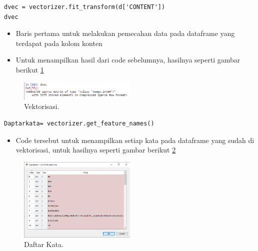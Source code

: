 \begin{enumerate}
\begin{verbatim}
dvec = vectorizer.fit_transform(d['CONTENT'])
dvec
\end{verbatim}
\begin{itemize}
\item Baris pertama untuk melakukan pemecahan data pada dataframe yang terdapat pada kolom konten
\item Untuk menampilkan hasil dari code sebelumnya, hasilnya seperti gambar berikut \ref{yt3}
\end{itemize}
		\begin{figure}[ht]
		\centerline{\includegraphics[width=0.5\textwidth]{figures/im/yt3.png}}
		\caption{Vektorisasi.}
		\label{yt3}
		\end{figure}

\begin{verbatim}
Daptarkata= vectorizer.get_feature_names()
\end{verbatim}
\begin{itemize}
\item Code tersebut untuk menampilkan setiap kata pada dataframe yang sudah di vektorisasi, untuk hasilnya seperti gambar berikut \ref{yt4}
\end{itemize}
		\begin{figure}[ht]
		\centerline{\includegraphics[width=0.5\textwidth]{figures/im/yt4.png}}
		\caption{Daftar Kata.}
		\label{yt4}
		\end{figure}


\end{enumerate}
